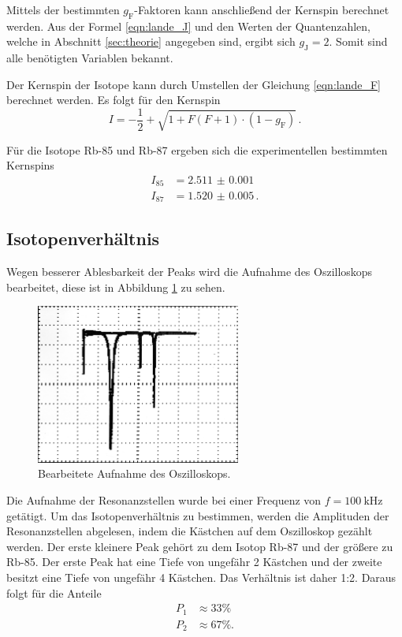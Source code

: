 Mittels der bestimmten $g_{\text{F}}$-Faktoren kann anschließend der Kernspin berechnet werden.
Aus der Formel \ref{eqn:lande_J} und den Werten der Quantenzahlen, welche in Abschnitt \ref{sec:theorie} angegeben sind,
ergibt sich $g_{\text{J}} = 2$.
Somit sind alle benötigten Variablen bekannt.

Der Kernspin der Isotope kann durch Umstellen der Gleichung \ref{eqn:lande_F} berechnet werden.
Es folgt für den Kernspin
\begin{equation}
    I = -\frac{1}{2} + \sqrt{1 + F(F+1) \cdot (1 - g_{\text{F}})} \, .
\end{equation}

Für die Isotope Rb-85 und Rb-87 ergeben sich die experimentellen bestimmten Kernspins
\begin{align}
    I_{85} &= \num{2.511(1)} \\
    I_{87} &= \num{1.520(5)} \, .
\end{align}

\subsection{Isotopenverhältnis}
\label{sec:Isotopenverhältnis}

Wegen besserer Ablesbarkeit der Peaks wird die Aufnahme des Oszilloskops bearbeitet, diese ist in Abbildung \ref{fig:edit} zu sehen.

\begin{figure}
    \centering
    \includegraphics[width=0.6\textwidth]{content/messung/edit.jpg}
    \caption{Bearbeitete Aufnahme des Oszilloskops.}
    \label{fig:edit}
\end{figure}

Die Aufnahme der Resonanzstellen wurde bei einer Frequenz von $f = \qty{100}{\kilo\hertz}$ getätigt.
Um das Isotopenverhältnis zu bestimmen, werden die Amplituden der Resonanzstellen abgelesen, indem
die Kästchen auf dem Oszilloskop gezählt werden.
Der erste kleinere Peak gehört zu dem Isotop Rb-87 und der größere zu Rb-85.
Der erste Peak hat eine Tiefe von ungefähr 2 Kästchen und der zweite besitzt eine Tiefe von ungefähr 4 Kästchen.
Das Verhältnis ist daher 1:2.
Daraus folgt für die Anteile
\begin{align}
    P_1 &\approx 33 \% \\
    P_2 &\approx 67 \% .
\end{align}

